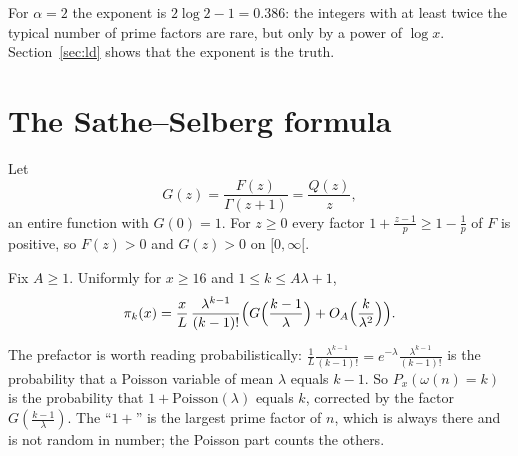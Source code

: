For $\alpha=2$ the exponent is $2\log2-1=0.386$: the integers with at least twice the typical number of prime factors are rare, but only by a power of $\log x$. Section~\ref{sec:ld} shows that the exponent is the truth.

\section{The Sathe--Selberg formula}

Let
\[
G(z)=\frac{F(z)}{\Gamma(z+1)}=\frac{Q(z)}z,
\]
an entire function with $G(0)=1$. For $z\ge0$ every factor $1+\frac{z-1}p\ge1-\frac1p$ of $F$ is positive, so $F(z)>0$ and $G(z)>0$ on $[0,\infty[$.

\begin{theorem}\label{thm:sathe}
Fix $A\ge1$. Uniformly for $x\ge16$ and $1\le k\le A\lambda+1$,
\[
\pi_k(x)=\frac xL\,\frac{\lambda^{k-1}}{(k-1)!}\Bigl(G\Bigl(\frac{k-1}\lambda\Bigr)+O_A\Bigl(\frac k{\lambda^2}\Bigr)\Bigr).
\]
\end{theorem}

The prefactor is worth reading probabilistically: $\frac1L\frac{\lambda^{k-1}}{(k-1)!}=e^{-\lambda}\frac{\lambda^{k-1}}{(k-1)!}$ is the probability that a Poisson variable of mean $\lambda$ equals $k-1$. So $P_x(\omega(n)=k)$ is the probability that $1+\mathrm{Poisson}(\lambda)$ equals $k$, corrected by the factor $G(\frac{k-1}\lambda)$. The ``$1+$'' is the largest prime factor of $n$, which is always there and is not random in number; the Poisson part counts the others.

